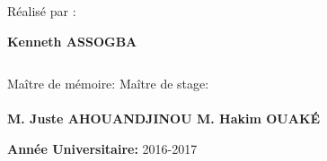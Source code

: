 \begin{titlepage}
    
\[\]

\begin{center}
Réalisé par : 
\end{center}

\begin{center}
\textbf{Kenneth ASSOGBA}
\end{center}

\[\]

Maître de mémoire: \qquad\qquad\qquad\qquad\qquad\qquad\qquad\qquad\qquad\qquad\qquad\qquad\qquad\qquad \quad Maître de stage:
\\\\\bf{M. Juste AHOUANDJINOU} \qquad\qquad\qquad\qquad\qquad\qquad\qquad\qquad\qquad\qquad\qquad\qquad   \quad\bf{ M. Hakim OUAK\'E}
 
    \vspace*{3cm}

     \begin{center}
     \textbf{Ann\'ee Universitaire:} 2016-2017
     \end{center}
     \vspace*{3cm}

 \end{titlepage}